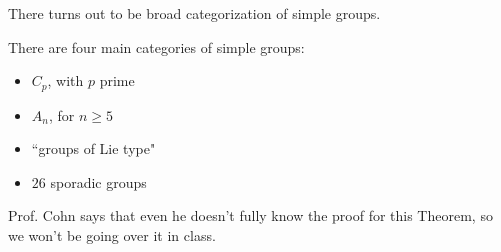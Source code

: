 There turns out to be broad categorization of simple groups.
\begin{theorem}
\thmlabel

There are four main categories of simple groups:
\begin{itemize}
    \item $C_p$, with $p$ prime
    \item $A_n$, for $n\geq 5$
    \item ``groups of Lie type"
    \item $26$ sporadic groups
\end{itemize}
\end{theorem}

Prof. Cohn says that even he doesn't fully know the proof for this Theorem, so we won't be going over it in class. 